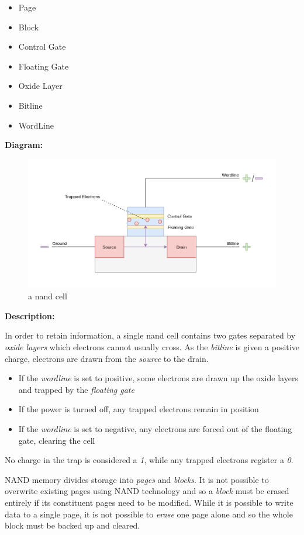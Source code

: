 \documentclass[9pt]{article}
\begin{document}
\begin{itemize}
\item Page
\item Block
\item Control Gate
\item Floating Gate
\item Oxide Layer
\item Bitline
\item WordLine
\end{itemize}

\textbf{Diagram:}

\begin{figure}[htbp]
\centering
\includegraphics[width=.9\linewidth]{./images/nand_flash.png}
\caption{a nand cell}
\end{figure}

\textbf{Description:}

In order to retain information, a single nand cell contains two gates separated by \emph{oxide layers} which electrons cannot usually cross. As the \emph{bitline} is given a positive charge, electrons are drawn from the \emph{source} to the drain.

\begin{itemize}
\item If the \emph{wordline} is set to positive, some electrons are drawn up the oxide layers and trapped by the \emph{floating gate}
\item If the power is turned off, any trapped electrons remain in position
\item If the \emph{wordline} is set to negative, any electrons are forced out of the floating gate, clearing the cell
\end{itemize}

No charge in the trap is considered a \emph{1}, while any trapped electrons register a \emph{0}.

NAND memory divides storage into \emph{pages} and \emph{blocks}. It is not possible to overwrite existing pages using NAND technology and so a \emph{block} must be erased entirely if its constituent pages need to be modified. While it is possible to write data to a single page, it is not possible to \emph{erase} one page alone and so the whole block must be  backed up and cleared.
\end{document}
